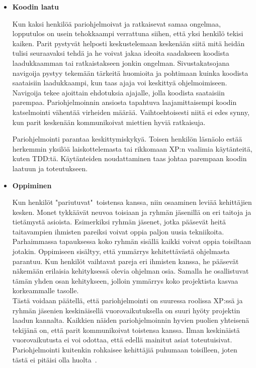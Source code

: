 \documentclass[finnish]{../tktltiki2}
\theoremstyle{definition}
\theoremstyle{remark}
\begin{document}
\begin{itemize}

\item {\bf Koodin laatu}

Kun kaksi henkilöä pariohjelmoivat ja ratkaisevat samaa ongelmaa, 
lopputulos on usein tehokkaampi verrattuna siihen, että yksi henkilö 
tekisi kaiken. Parit pystyvät helposti keskustelemaan keskenään siitä 
mitä heidän tulisi seuraavaksi tehdä ja he voivat jakaa ideoita 
saadakseen koodista laadukkaamman tai ratkaistakseen jonkin ongelman. 
Sivustakatsojana navigoija pystyy tekemään tärkeitä huomioita ja 
pohtimaan kuinka koodista saataisiin laadukkaampi, kun taas ajaja voi 
keskittyä ohjelmoimiseen. Navigoija tekee ajoittain ehdotuksia 
ajajalle, jolla koodista saataisiin parempaa.
Pariohjelmoinnin ansiosta tapahtuva laajamittaisempi koodin 
katselmointi vähentää virheiden määrää. Vaihtoehtoisesti
niitä ei edes synny, kun parit keskenään kommunikoivat miettien hyviä 
ratkaisuja.

Pariohjelmointi parantaa keskittymiskykyä. Toisen henkilön 
läsnäolo estää herkemmin yksilöä laiskottelemasta tai rikkomaan XP:n
vaalimia käytänteitä, kuten TDD:tä. Käytänteiden noudattaminen taas 
johtaa parempaan koodin laatuun ja toteutukseen.

\item {\bf Oppiminen}

Kun henkilöt "pariutuvat"~toistensa kanssa, niin osaaminen 
leviää kehittäjien kesken. Monet tykkäävät neuvoa toisiaan ja ryhmän 
jäsenillä
on eri taitoja ja tietämystä asioista. Esimerkiksi ryhmän jäsenet, 
jotka pääsevät heitä taitavampien ihmisten pareiksi voivat oppia
paljon uusia tekniikoita. Parhaimmassa tapauksessa koko ryhmän sisällä 
kaikki voivat oppia toisiltaan jotakin.
Oppimiseen sisältyy, että ymmärrys kehitettävästä ohjelmasta 
parantuu. Kun henkilöt vaihtavat
pareja eri ihmisten kanssa, he pääsevät näkemään erilaisia 
kehityksessä olevia ohjelman osia. Samalla he osallistuvat tämän 
yhden osan
kehitykseen, jolloin ymmärrys koko projektista kasvaa korkeammalle 
tasolle.\\

Tästä voidaan päätellä, että pariohjelmointi on suuressa roolissa 
XP:ssä ja ryhmän jäsenien keskinäisellä vuorovaikutuksella on suuri 
hyöty projektin laadun kannalta. Kaikkien näiden pariohjelmoinnin 
hyvien puolien yhteisenä tekijänä on, että parit kommunikoivat 
toistensa kanssa. Ilman keskinäistä vuorovaikutusta ei voi odottaa, 
että edellä mainitut asiat toteutuisivat. Pariohjelmointi kuitenkin 
rohkaisee kehittäjiä puhumaan toisilleen, joten tästä ei pitäisi olla 
huolta~\cite{Zarb:2012:UCW:2384716.2384738}.

\end{itemize}
\end{document}
